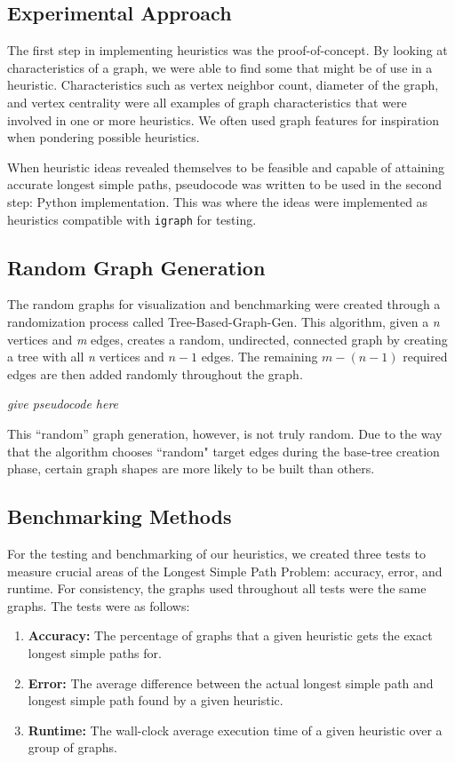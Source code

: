 \documentclass[twocolumn,showpacs,%
  nofootinbib,aps,superscriptaddress,%
  eqsecnum,prd,notitlepage,showkeys,11pt]{article}
\begin{document}
\subsection{Experimental Approach}

The first step in implementing heuristics was the proof-of-concept. By looking at characteristics of a graph, we were able to find some that might be of use in a heuristic. Characteristics such as vertex neighbor count, diameter of the graph, and vertex centrality were all examples of graph characteristics that were involved in one or more heuristics. We often used graph features for inspiration when pondering possible heuristics.

When heuristic ideas revealed themselves to be feasible and capable of attaining accurate longest simple paths, pseudocode was written to be used in the second step: Python implementation. This was where the ideas were implemented as heuristics compatible with \texttt{igraph} for testing.

\subsection{Random Graph Generation}

The random graphs for visualization and benchmarking were created through a randomization process called Tree-Based-Graph-Gen. This algorithm, given a \textit{n} vertices and \textit{m} edges, creates a random, undirected, connected graph by creating a tree with all \textit{n} vertices and \(n-1\) edges. The remaining \(m - (n - 1)\) required edges are then added randomly throughout the graph.

{\em give pseudocode here}

This ``random'' graph generation, however, is not truly random. Due to the way that the algorithm chooses ``random" target edges during the base-tree creation phase, certain graph shapes are more likely to be built than others. 

\subsection{Benchmarking Methods}
For the testing and benchmarking of our heuristics, we created three tests to measure crucial areas of the Longest Simple Path Problem: accuracy, error, and runtime. For consistency, the graphs used throughout all tests were the same graphs. The tests were as follows:

\begin{enumerate}
    \item \textbf{Accuracy:} The percentage of graphs that a given heuristic gets the exact longest simple paths for.
    \item \textbf{Error:} The average difference between the actual longest simple path and longest simple path found by a given heuristic.
    \item \textbf{Runtime:} The wall-clock average execution time of a given heuristic over a group of graphs.
\end{enumerate}
\end{document}
